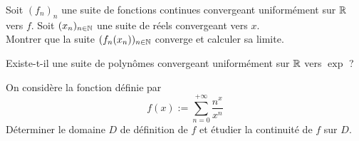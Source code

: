 \begin{exo}
	\label{seriesfonc1}
	Soit $(f_n)_n$ une suite de fonctions continues convergeant uniformément 
	sur $\operatorname{\mathbb R}$ vers $f$. 
	Soit $(x_n)_{n\in\operatorname{\mathbb N}}$ une suite de réels convergeant vers $x$.\\
	Montrer que la suite $(f_n(x_n))_{n\in\operatorname{\mathbb N}}$ converge et calculer sa limite.
\end{exo}

\begin{exo}
	\label{seriesfonc2}
	Existe-t-il une suite de polynômes convergeant uniformément sur $\operatorname{\mathbb R}$ vers $\exp$ ?
\end{exo}

\begin{exo}
	\label{seriesfonc3}
	On considère la fonction définie par \[f(x):=\sum_{n=0}^{+\infty}\frac{n^x}{x^n}\]
	Déterminer le domaine $D$ de définition de $f$ et étudier la continuité de $f$ sur $D$.
\end{exo}
